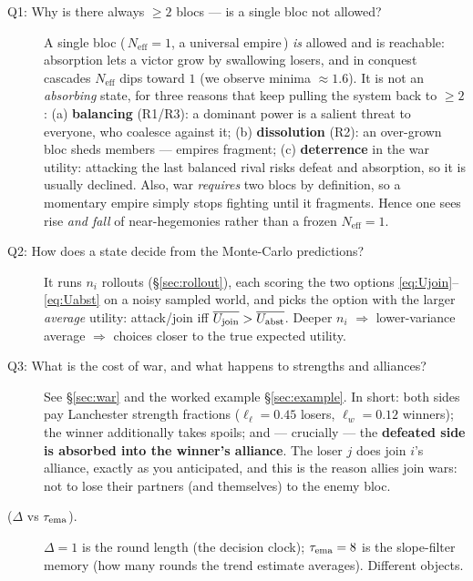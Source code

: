 \documentclass[11pt]{article}
\newcommand{\Neff}{N_{\mathrm{eff}}}
\begin{document}
\begin{description}
\item[Q1: Why is there always $\ge2$ blocs --- is a single bloc not allowed?]
A single bloc (\,$\Neff=1$, a universal empire\,) \emph{is} allowed and is
reachable: absorption lets a victor grow by swallowing losers, and in conquest
cascades $\Neff$ dips toward $1$ (we observe minima $\approx1.6$). It is not an
\emph{absorbing} state, for three reasons that keep pulling the system back to
$\ge2$: (a) \textbf{balancing} (R1/R3): a dominant power is a salient threat to
everyone, who coalesce against it; (b) \textbf{dissolution} (R2): an over-grown
bloc sheds members --- empires fragment; (c) \textbf{deterrence} in the war
utility: attacking the last balanced rival risks defeat and absorption, so it is
usually declined. Also, war \emph{requires} two blocs by definition, so a
momentary empire simply stops fighting until it fragments. Hence one sees rise
\emph{and fall} of near-hegemonies rather than a frozen $\Neff=1$.

\item[Q2: How does a state decide from the Monte-Carlo predictions?]
It runs $n_i$ rollouts (\S\ref{sec:rollout}), each scoring the two options
\eqref{eq:Ujoin}--\eqref{eq:Uabst} on a noisy sampled world, and picks the option
with the larger \emph{average} utility: attack/join iff
$\overline{U_{\rm join}}>\overline{U_{\rm abst}}$. Deeper $n_i$ $\Rightarrow$
lower-variance average $\Rightarrow$ choices closer to the true expected utility.

\item[Q3: What is the cost of war, and what happens to strengths and alliances?]
See \S\ref{sec:war} and the worked example \S\ref{sec:example}. In short: both
sides pay Lanchester strength fractions ($\ell_\ell=0.45$ losers, $\ell_w=0.12$
winners); the winner additionally takes spoils; and --- crucially --- the
\textbf{defeated side is absorbed into the winner's alliance}. The loser $j$ does
join $i$'s alliance, exactly as you anticipated, and this is the reason allies
join wars: not to lose their partners (and themselves) to the enemy bloc.

\item[($\Delta$ vs $\tau_{\rm ema}$).] $\Delta=1$ is the round length (the
decision clock); $\tau_{\rm ema}=8$ is the slope-filter memory (how many rounds
the trend estimate averages). Different objects.
\end{description}

\end{document}
